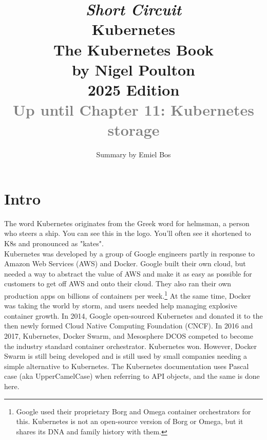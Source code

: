 \documentclass[table, xcdraw]{article}%
\title{
\textit{Short Circuit}\\
\vspace{15px}
\huge
Kubernetes\\
\vspace{20px}
\large
The Kubernetes Book\\
by Nigel Poulton\\
2025 Edition\\
\textcolor{gray}{Up until Chapter 11: Kubernetes storage}
}
\author{Summary by Emiel Bos}
\date{}
\begin{document}
\maketitle

\section{Intro}

The word Kubernetes originates from the Greek word for helmsman, a person who steers a ship. You can see this in the logo. You’ll often see it shortened to K8s and pronounced as "kates".\\
Kubernetes was developed by a group of Google engineers partly in response to Amazon Web Services (AWS) and Docker. Google built their own cloud, but needed a way to abstract the value of AWS and make it as easy as possible for customers to get off AWS and onto their cloud. They also ran their own production apps on billions of containers per week.\footnote{Google used their proprietary Borg and Omega container orchestrators for this. Kubernetes is not an open-source version of Borg or Omega, but it shares its DNA and family history with them.} At the same time, Docker was taking the world by storm, and users needed help managing explosive container growth. In 2014, Google open-sourced Kubernetes and donated it to the then newly formed Cloud Native Computing Foundation (CNCF).
In 2016 and 2017, Kubernetes, Docker Swarm, and Mesosphere DCOS competed to become the industry standard container orchestrator. Kubernetes won. However, Docker Swarm is still being developed and is still used by small companies needing a simple alternative to Kubernetes.
The Kubernetes documentation uses Pascal case (aka UpperCamelCase) when referring to API objects, and the same is done here.
\end{document}
